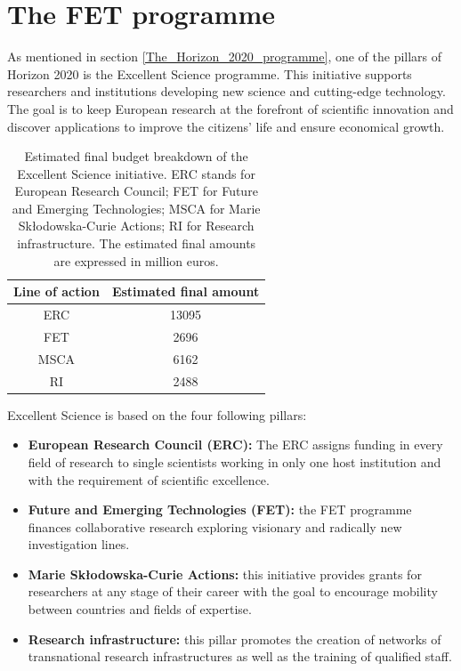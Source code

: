 \section{The FET programme} \label{The_FET_programme}
As mentioned in section \ref{The_Horizon_2020_programme}, one of the pillars of Horizon 2020 is the Excellent Science programme. This initiative supports researchers and institutions developing new science and cutting-edge technology. The goal is to keep European research at the forefront of scientific innovation and discover applications to improve the citizens' life and ensure economical growth.  

\begin{table}[t]
 \begin{center}
  \begin{tabular}{cc}
   \hline 
   \hline
   Line of action & Estimated final amount \\ 
   \hline
   \hline
   ERC & 13095 \\
   FET & 2696 \\
   MSCA & 6162 \\
   RI & 2488 \\
   \hline
   \hline
  \end{tabular}
 \end{center} 
 \caption{Estimated final budget breakdown of the Excellent Science initiative. ERC stands for European Research Council; FET for Future and Emerging Technologies; MSCA for Marie Sk\l{}odowska-Curie Actions; RI for Research infrastructure. The estimated final amounts are expressed in million euros.}
\label{FET_budget_breakdown} 
\end{table}

Excellent Science is based on the four following pillars: 

\begin{itemize}
 \item \textbf{European Research Council (ERC):} The ERC assigns funding in every field of research to single scientists working in only one host institution and with the requirement of scientific excellence.  
 \item \textbf{Future and Emerging Technologies (FET):} the FET programme finances collaborative research exploring visionary and radically new investigation lines. 
 \item \textbf{Marie Sk\l{}odowska-Curie Actions:} this initiative provides grants for researchers at any stage of their career with the goal to encourage mobility between countries and fields of expertise. 
 \item \textbf{Research infrastructure:} this pillar promotes the creation of networks of transnational research infrastructures as well as the training of qualified staff. 
\end{itemize}

